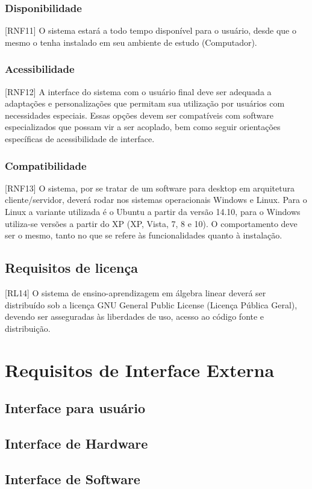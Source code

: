 \documentclass{scrreprt}
\begin{document}
\subsubsection{Disponibilidade}
[RNF11] O sistema estará a todo tempo disponível para o usuário, desde que o mesmo o tenha instalado em seu ambiente de estudo (Computador).

\subsubsection{Acessibilidade}
[RNF12] A interface do sistema com o usuário final deve ser adequada a adaptações e personalizações que permitam sua utilização por usuários com necessidades especiais. Essas opções devem ser compatíveis com software especializados que possam vir a ser acoplado, bem como seguir orientações específicas de acessibilidade de interface.

\subsubsection{Compatibilidade}
[RNF13] O sistema, por se tratar de um software para desktop em arquitetura cliente/servidor, deverá rodar nos sistemas operacionais Windows e Linux. Para o Linux a variante utilizada é o Ubuntu a partir da versão 14.10, para o Windows utiliza-se versões a partir do XP (XP, Vista, 7, 8 e 10). O comportamento deve ser o mesmo, tanto no que se refere às funcionalidades quanto à instalação.

\subsection{Requisitos de licença}
[RL14] O sistema de ensino-aprendizagem em álgebra linear deverá ser distribuído sob a licença GNU General Public License (Licença Pública Geral), devendo ser asseguradas às liberdades de uso, acesso ao código fonte e distribuição.

\section{Requisitos de Interface Externa}
\subsection{Interface para usuário}
\subsection{Interface de Hardware}
\subsection{Interface de Software}
\end{document}
